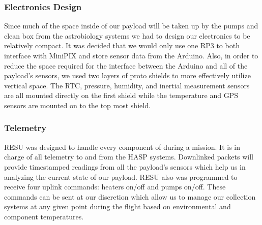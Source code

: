 \subsubsection{Electronics Design}
Since much of the space inside of our payload will be taken up by the pumps and clean box from the astrobiology systems we had to design our electronics to be relatively compact.  It was decided that we would only use one RP3 to both interface with MiniPIX and store sensor data from the Arduino.  Also, in order to reduce the space required for the interface between the Arduino and all of the payload's sensors, we used two layers of proto shields to more effectively utilize vertical space.  The RTC, pressure, humidity, and inertial measurement sensors are all mounted directly on the first shield while the temperature and GPS sensors are mounted on to the top most shield. 

\subsubsection{Telemetry}
RESU was designed to handle every component of during a mission.  It is in charge of all  telemetry to and from the HASP systems.  Downlinked packets will provide timestamped readings from all the payload's sensors which help us in analyzing the current state of our payload.  RESU also was programmed to receive four uplink commands: heaters on/off and pumps on/off.  These commands can be sent at our discretion which allow us to manage our collection systems at any given point during the flight based on environmental and component temperatures. 
